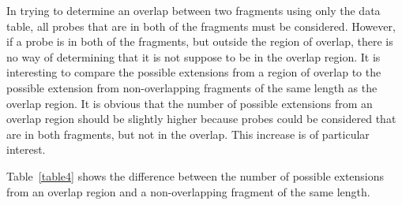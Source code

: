 

In trying to determine an overlap between two fragments using only the data
table, all probes that are in both of the fragments must be considered.
However, if a probe is in both of the fragments, but outside the region of
overlap, there is no way of determining that it is not suppose to be in the
overlap region.  It is interesting to compare the possible extensions
from a region of overlap to the possible extension from
non-overlapping fragments of the same length as the overlap region.  It is
obvious that the number of possible extensions from an overlap region should
be slightly higher
because probes could be considered that are in both fragments, but not in
the overlap.  This increase
is of particular interest.

Table~\ref{table4} shows the difference
between the number of possible extensions
from an overlap region and a non-overlapping fragment of the same
length.


